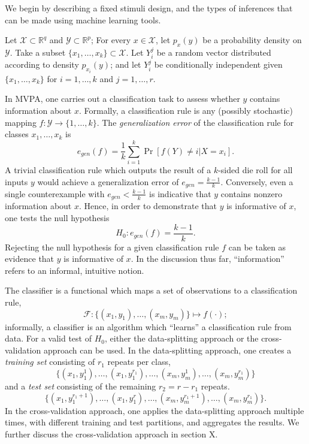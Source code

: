 \documentclass[12pt]{article}
\begin{document}
We begin by describing a fixed stimuli design,
and the types of inferences that can be made using machine learning tools.

Let
$\mathcal{X} \subset \mathbb{R}^q$ and
$\mathcal{Y} \subset \mathbb{R}^p$; 
For every $x \in \mathcal{X}$, let $p_x(y)$
be a probability density on $\mathcal{Y}$.  
Take a subset
$\{x_1,\hdots, x_k\} \subset \mathcal{X}$.
Let $Y_i^j$ be a random
vector distributed according to density $p_{x_i}(y)$; and let $Y_i^j$
be conditionally independent given $\{x_1,\hdots, x_k\}$ for $i =
1,\hdots, k$ and $j = 1, \hdots, r.$
 
In MVPA, one carries out a classification task to assess whether $y$
contains information about $x$.  Formally, a classification rule is
any (possibly stochastic) mapping $f: \mathcal{Y} \to \{1,\hdots,
k\}$.  The \emph{generalization error} of the classification rule for classes $x_1,\hdots, x_k$ is
\[
e_{gen}(f) = \frac{1}{k} \sum_{i=1}^k\Pr[f(Y) \neq i | X = x_i].
\]
A trivial classification rule which outputs the result of a $k$-sided
die roll for all inputs $y$ would achieve a generalization error of
$e_{gen} = \frac{k-1}{k}$.  Conversely, even a single counterexample
with $e_{gen} < \frac{k-1}{k}$ is indicative that $y$ contains nonzero
information about $x$.  Hence, in order to demonstrate that $y$ is
informative of $x$, one tests the null hypothesis
\[
H_0: e_{gen}(f) = \frac{k-1}{k}.
\]
Rejecting the null hypothesis for a given classification rule $f$ can
be taken as evidence that $y$ is informative of $x$.  In the
discussion thus far, ``information'' refers to an informal, intuitive
notion.

The classifier is a functional which maps a set of observations to a classification rule,
\[
\mathcal{F}: \{(x_1,y_1),\hdots, (x_m, y_m)\} \mapsto f(\cdot);
\]
informally, a classifier is an algorithm which ``learns'' a classification rule from data.
For a valid test of $H_0$, 
either the data-splitting approach or the cross-validation approach can be used.
In the data-splitting approach, one creates a \emph{training set} consisting of $r_1$ repeats per class,
\[
\{(x_1, y_1^1),\hdots, (x_1,y_1^{r_1}), \hdots, (x_m, y_m^1),\hdots, (x_m,y_m^{r_1})\}
\]
and a \emph{test set} consisting of the remaining $r_2 = r - r_1$ repeats.
\[
\{(x_1, y_1^{r_1 + 1}),\hdots, (x_1,y_1^{r}), \hdots, (x_m, y_m^{r_1 + 1}),\hdots, (x_m,y_m^{r_1})\}.
\]
In the cross-validation approach, one applies the data-splitting
approach multiple times, with different training and test partitions,
and aggregates the results.  We further discuss the cross-validation
approach in section X.
\end{document}
